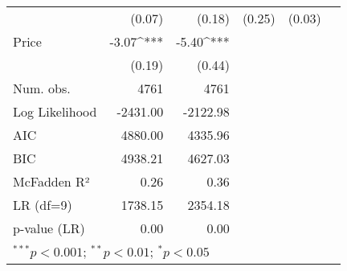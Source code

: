 \begin{table}[h]
\begin{center}
\begin{tabular}{l D{.}{.}{5.5} D{.}{.}{5.5} D{.}{.}{2.5} D{.}{.}{2.5} D{.}{.}{3.2}}
                                   & (0.07)      & (0.18)      & (0.25)      & (0.03)     &        \\
Price                              & -3.07^{***} & -5.40^{***} &             &            &        \\
                                   & (0.19)      & (0.44)      &             &            &        \\
\midrule
Num. obs.                          & 4761        & 4761        &             &            &        \\
Log Likelihood                     & -2431.00    & -2122.98    &             &            &        \\
AIC                                & 4880.00     & 4335.96     &             &            &        \\
BIC                                & 4938.21     & 4627.03     &             &            &        \\
McFadden R²                        & 0.26        & 0.36        &             &            &        \\
LR  (df=9)                       & 1738.15     & 2354.18     &             &            &        \\
p-value (LR)                       & 0.00        & 0.00        &             &            &        \\
\bottomrule
{}
\end{tabular}
\end{center}
\end{table}
